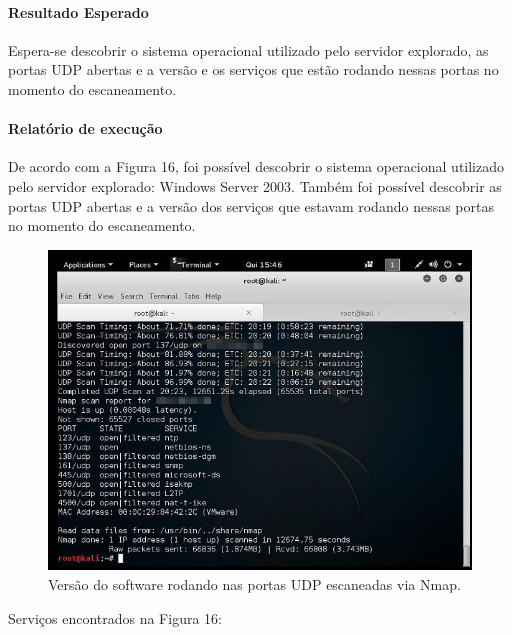 \documentclass[
    12pt,               %
    openright,          %
    oneside,            %
    a4paper,            %
    section=TITLE,     %
    english,            %
    french,             %
    spanish,            %
    brazil              %
    ]{abntex2}
\begin{document}
\paragraph*{Resultado Esperado}

Espera-se descobrir o sistema operacional utilizado pelo servidor explorado, as portas UDP abertas e a versão e os serviços que estão rodando nessas portas no momento do escaneamento.



\paragraph*{Relatório de execução}

De acordo com a Figura 16, foi possível descobrir o sistema operacional utilizado pelo servidor explorado: Windows Server 2003. Também foi possível descobrir as portas UDP abertas e a versão dos serviços que estavam rodando nessas portas no momento do escaneamento.





\begin{figure}[htp]
\centering
\caption{Versão do software rodando nas portas UDP escaneadas via Nmap.}
\includegraphics[width=450px]{image10.jpeg}
\end{figure}
\ifdefined\FloatBarrier \FloatBarrier \fi







Serviços encontrados na Figura 16:
\end{document}
